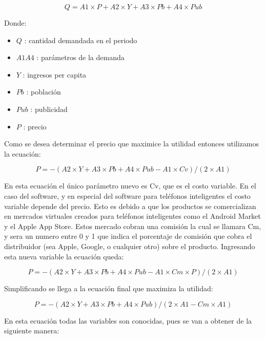 \documentclass[a4paper, 12pt, oneside]{article}
\begin{document}
	\begin{equation}
	Q = A1 \times P + A2 \times Y + A3 \times Pb + A4 \times Pub 
	\end{equation}

	Donde:

	\begin{itemize}
	      \item $Q$ : cantidad demandada en el periodo
	      \item $A1 A4$ : parámetros de la demanda
	      \item $Y$ : ingresos per capita
	      \item $Pb$ : población
	      \item $Pub$ : publicidad
	      \item $P$ : precio
	\end{itemize}

	Como se desea determinar el precio que maximice la utilidad entonces utilizamos la ecuación:

	\begin{equation}
	P = -(A2 \times Y + A3 \times Pb + A4 \times Pub  - A1 \times Cv) / (2 \times A1)
	\end{equation}

	En esta ecuación el único parámetro nuevo es Cv, que es el costo variable. En el caso del software, y en especial del software para teléfonos inteligentes el costo variable
	depende del precio. Esto es debido a que los productos se comercializan en mercados virtuales creados para teléfonos inteligentes como el Android Market y el Apple App Store.
	Estos mercado cobran una comisión la cual se llamara Cm, y sera un numero entre 0 y 1 que indica el porcentaje de comisión que cobra el distribuidor (sea Apple, Google,
	o cualquier otro) sobre el producto. Ingresando esta nueva variable la ecuación queda:

	\begin{equation}
	P = -(A2 \times Y + A3 \times Pb + A4 \times Pub  - A1 \times Cm \times P) / (2 \times A1)
	\end{equation}

	Simplificando se llega a la ecuación final que maximiza la utilidad:

	\begin{equation}
	P = -(A2 \times Y + A3 \times Pb + A4 \times Pub) / (2 \times A1 - Cm \times A1)
	\end{equation}

	En esta ecuación todas las variables son conocidas, pues se van a obtener de la siguiente  manera:
\end{document}
